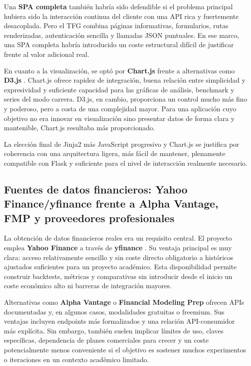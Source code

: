 Una \textbf{SPA completa} también habría sido defendible si el problema principal hubiera sido la interacción continua del cliente con una API rica y fuertemente desacoplada. Pero el TFG combina páginas informativas, formularios, rutas renderizadas, autenticación sencilla y llamadas JSON puntuales. En ese marco, una SPA completa habría introducido un coste estructural difícil de justificar frente al valor adicional real.

En cuanto a la visualización, se optó por \textbf{Chart.js} \cite{chartjs} frente a alternativas como \textbf{D3.js} \cite{d3}. Chart.js ofrece rapidez de integración, buena relación entre simplicidad y expresividad y suficiente capacidad para las gráficas de análisis, benchmark y series del modo carrera. D3.js, en cambio, proporciona un control mucho más fino y poderoso, pero a costa de una complejidad mayor. Para una aplicación cuyo objetivo no era innovar en visualización sino presentar datos de forma clara y mantenible, Chart.js resultaba más proporcionado.

La elección final de Jinja2 más JavaScript progresivo y Chart.js se justifica por coherencia con una arquitectura ligera, más fácil de mantener, plenamente compatible con Flask y suficiente para el nivel de interacción realmente necesario.

\subsection{Fuentes de datos financieros: Yahoo Finance/yfinance frente a Alpha Vantage, FMP y proveedores profesionales}

La obtención de datos financieros reales era un requisito central. El proyecto emplea \textbf{Yahoo Finance} a través de \textbf{yfinance} \cite{yfinance}. Su ventaja principal es muy clara: acceso relativamente sencillo y sin coste directo obligatorio a históricos ajustados suficientes para un proyecto académico. Esta disponibilidad permite construir backtests, métricas y comparativas sin introducir desde el inicio un coste económico alto ni barreras de integración mayores.

Alternativas como \textbf{Alpha Vantage} \cite{alphavantage} o \textbf{Financial Modeling Prep} \cite{fmp} ofrecen APIs documentadas y, en algunos casos, modalidades gratuitas o freemium. Sus ventajas incluyen endpoints más formalizados y una relación API-consumidor más explícita. Sin embargo, también suelen implicar límites de uso, claves específicas, dependencia de planes comerciales para crecer y un coste potencialmente menos conveniente si el objetivo es sostener muchos experimentos o iteraciones en un contexto académico limitado.

